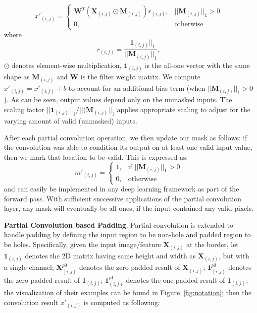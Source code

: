 \documentclass[10pt,twocolumn,letterpaper]{article}
\begin{document}
\begin{equation}
\label{eq:partconv}
    x'_{(i,j)} = \begin{cases}
     \mathbf{W}^T(\mathbf{X}_{(i,j)}\odot\mathbf{M}_{(i,j)})r_{(i,j)},&||\mathbf{M}_{(i,j)}||_{1}>0  \\
        0,&\text{otherwise}
    \end{cases}
\end{equation}where
\begin{equation}
    r_{(i,j)} = \frac{||\mathbf{1}_{(i,j)}||_1}{||\mathbf{M}_{(i,j)}||_1},
\end{equation}$\odot$ denotes element-wise multiplication, $\mathbf{1}_{(i,j)}$ is the all-one vector with the same shape as $\mathbf{M}_{(i,j)}$ and $\mathbf{W}$ is the filter weight matrix. We compute $x'_{(i,j)}=x'_{(i,j)}+b$ to account for an additional bias term (when $||\mathbf{M}_{(i,j)}||_{1}>0$). As can be seen, output values depend only on the unmasked inputs. The scaling factor $||\mathbf{1}_{(i,j)}||_1/||(\mathbf{M}_{(i,j)}||_1$ applies appropriate scaling to adjust for the varying amount of valid (unmasked) inputs.

After each partial convolution operation, we then update our mask as follows: if the convolution was able to condition its output on at least one valid input value, then we mark that location to be valid. This is expressed as:
\begin{equation}
m'_{(i,j)}=\begin{cases}
    1, & \text{if } ||\mathbf{M}_{(i,j)}||_{1}>0  \\
    0, & \text{otherwise}
\end{cases}
\label{eq:mask_update}
\end{equation}
and can easily be implemented in any deep learning framework as part of the forward pass. With sufficient successive applications of the partial convolution layer, any mask will eventually be all ones, if the input contained any valid pixels. 

\textbf{Partial Convolution based Padding}.
Partial convolution is extended to handle padding by defining the input region to be non-hole and padded region to be holes. Specifically,
given the input image/feature $\mathbf{X}_{(i,j)}$ at the border, let $\mathbf{1}_{(i,j)}$ denotes the 2D matrix having same height and width as $\mathbf{X}_{(i,j)}$, but with a single channel; $\mathbf{X}^{p0}_{(i,j)}$ denotes the zero padded result of $\mathbf{X}_{(i,j)}$; $\mathbf{1}^{p0}_{(i,j)}$ denotes the zero padded result of $\mathbf{1}_{(i,j)}$; $\mathbf{1}^{p1}_{(i,j)}$ denotes the one padded result of $\mathbf{1}_{(i,j)}$; the visualization of their examples can be found in Figure~\ref{fig:notation}; then the convolution result $x'_{(i,j)}$ is computed as following:
\end{document}
